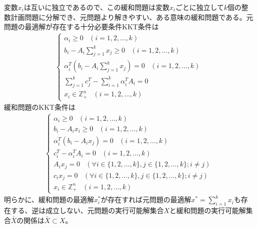 \documentclass{jsarticle}
\begin{document}
変数$x_i$は互いに独立であるので、この緩和問題は変数$x_i$ごとに独立して$k$個の整数計画問題に分解でき、元問題より解きやすい、ある意味の緩和問題である。元問題の最適解が存在する十分必要条件KKT条件は
\begin{eqnarray}
\begin{cases}
\alpha_i \ge 0 \,\,\,\,\, (i = 1,2,\dots,k)\\
b_i - A_i\sum_{j=1}^k x_j \ge 0 \,\,\,\,\, (i = 1,2,\dots,k) \\
\alpha_i^T(b_i - A_i\sum_{j=1}^k x_j) =0 \,\,\,\,\, (i = 1,2,\dots,k) \\
\sum_{j=1}^k c_j^T - \sum_{i=1}^k \alpha_i^T A_i =0 \\
x_i \in \mathbb{Z}_+^n \,\,\,\,\, (i = 1,2,\dots,k)
\end{cases}
\end{eqnarray}
緩和問題のKKT条件は
\begin{eqnarray}
\begin{cases}
\alpha_i \ge 0 \,\,\,\,\, (i = 1,2,\dots,k)\\
b_i - A_ix_i \ge 0 \,\,\,\,\, (i = 1,2,\dots,k) \\
\alpha_i^T(b_i - A_i x_j) =0 \,\,\,\,\, (i = 1,2,\dots,k) \\
c_i^T - \alpha_i^T A_i =0 \,\,\,\,\, (i = 1,2,\dots,k) \\
A_ix_j =0 \,\,\,\,\, (\forall i\in \{1,2,\dots,k\}, j\in \{1,2,\dots,k\};i \neq j) \\
c_ix_j =0 \,\,\,\,\, (\forall i\in \{1,2,\dots,k\}, j\in \{1,2,\dots,k\};i \neq j) \\
x_i \in \mathbb{Z}_+^n \,\,\,\,\, (i = 1,2,\dots,k)
\end{cases}
\end{eqnarray}
明らかに、緩和問題の最適解$x_i^*$が存在すれば元問題の最適解$x^*=\sum_{i=1}^k x_i$も存在する、逆は成立しない、元問題の実行可能解集合$X$と緩和問題の実行可能解集合$\bar{X}$の関係は$\bar{X} \subset X$。\\
\end{document}
